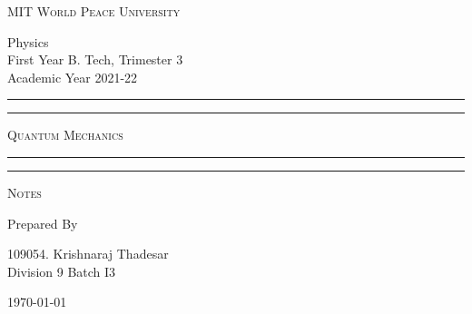 \documentclass[11pt]{article}
\begin{document}
	
	\begin{titlepage} 
		\centering 
		
		
		\huge\textsc{
			MIT World Peace University
		}\\
	
		\vspace{0.75\baselineskip} %
		
		\LARGE{
			Physics\\
			First Year B. Tech, Trimester 3\\
			Academic Year 2021-22
		}
		
		\vfill %
		
		
		\rule{\textwidth}{1.6pt}\vspace*{-\baselineskip}\vspace*{2pt}
		\rule{\textwidth}{0.6pt}
		\vspace{0.75\baselineskip} %
		
		
		
		\huge{\textsc{
				Quantum Mechanics
			}} \\
		
		
		
		\vspace{0.5\baselineskip} %
		\rule{\textwidth}{0.6pt}\vspace*{-\baselineskip}\vspace*{2.8pt}
		\rule{\textwidth}{1.6pt}
		
		\vspace{1\baselineskip} %

			
		\LARGE\textsc{
			Notes
		} %
		\vfill
		
		
		Prepared By
		\vspace{0.5\baselineskip} %
		
		\Large{
			109054. Krishnaraj Thadesar\\
			\vspace{1cm}
			Division 9 Batch I3
		}
		
		
		\vspace{0.5\baselineskip} %
		\today

	\end{titlepage}
\end{document}
